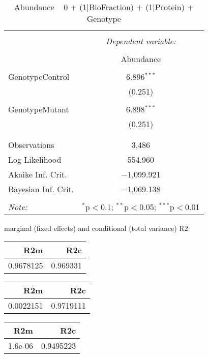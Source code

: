 \documentclass[11pt]{report}
\begin{document}
\begin{table}[!htbp] \centering 
  \caption{Abundance ~ 0 + (1|BioFraction) + (1|Protein) + Genotype} 
  \label{} 
\begin{tabular}{@{\extracolsep{5pt}}lc} 
\\[-1.8ex]\hline 
\hline \\[-1.8ex] 
 & \multicolumn{1}{c}{\textit{Dependent variable:}} \\ 
\cline{2-2} 
\\[-1.8ex] & Abundance \\ 
\hline \\[-1.8ex] 
 GenotypeControl & 6.896$^{***}$ \\ 
  & (0.251) \\ 
  & \\ 
 GenotypeMutant & 6.898$^{***}$ \\ 
  & (0.251) \\ 
  & \\ 
\hline \\[-1.8ex] 
Observations & 3,486 \\ 
Log Likelihood & 554.960 \\ 
Akaike Inf. Crit. & $-$1,099.921 \\ 
Bayesian Inf. Crit. & $-$1,069.138 \\ 
\hline 
\hline \\[-1.8ex] 
\textit{Note:}  & \multicolumn{1}{r}{$^{*}$p$<$0.1; $^{**}$p$<$0.05; $^{***}$p$<$0.01} \\ 
\end{tabular} 
\end{table} 
marginal (fixed effects) and conditional (total variance) R2:

\begin{tabular}{r|r}
\hline
R2m & R2c\\
\hline
0.9678125 & 0.969331\\
\hline
\end{tabular}

\begin{tabular}{r|r}
\hline
R2m & R2c\\
\hline
0.0022151 & 0.9719111\\
\hline
\end{tabular}

\begin{tabular}{r|r}
\hline
R2m & R2c\\
\hline
1.6e-06 & 0.9495223\\
\hline
\end{tabular}
\end{document}
